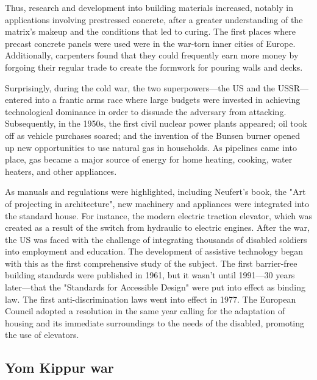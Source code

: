 Thus, research and development into building materials increased, notably in applications involving prestressed concrete, after a greater understanding of the matrix's makeup and the conditions that led to curing. The first places where precast concrete panels were used were in the war-torn inner cities of Europe.\autocite{krausmann2009growth} Additionally, carpenters found that they could frequently earn more money by forgoing their regular trade to create the formwork for pouring walls and decks.\autocite{erlich1986our}

Surprisingly, during the cold war, the two superpowers—the US and the USSR—entered into a frantic arms race where large budgets were invested in achieving technological dominance in order to dissuade the adversary from attacking. Subsequently, in the 1950s, the first civil nuclear power plants appeared;\autocite{lepage2015atlas} oil took off as vehicle purchases soared; and the invention of the Bunsen burner opened up new opportunities to use natural gas in households. As pipelines came into place, gas became a major source of energy for home heating, cooking, water heaters, and other appliances.\autocite{smil2000energy} 

As manuals and regulations were highlighted, including Neufert’s book, the "Art of projecting in architecture", new machinery and appliances were integrated into the standard house. For instance, the modern electric traction elevator, which was created as a result of the switch from hydraulic to electric engines. After the war, the US was faced with the challenge of integrating thousands of disabled soldiers into employment and education. The development of assistive technology began with this as the first comprehensive study of the subject.\autocite{prisco2019short} The first barrier-free building standards were published in 1961, but it wasn't until 1991—30 years later—that the "Standards for Accessible Design" were put into effect as binding law. The first anti-discrimination laws went into effect in 1977. The European Council adopted a resolution in the same year calling for the adaptation of housing and its immediate surroundings to the needs of the disabled,\autocite{christ2009access} promoting the use of elevators. 

\subsection{Yom Kippur war}
\label{sec:yom_kippur_war}

